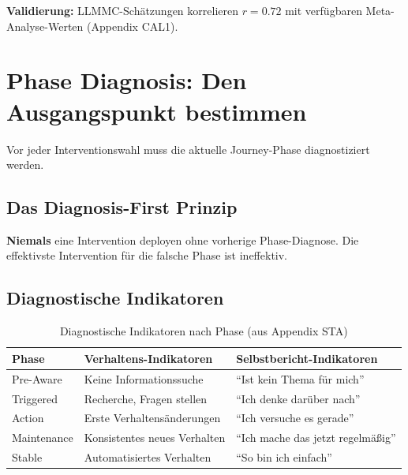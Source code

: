 \textbf{Validierung:} LLMMC-Schätzungen korrelieren $r = 0.72$ mit verfügbaren Meta-Analyse-Werten (Appendix CAL1).


\section{Phase Diagnosis: Den Ausgangspunkt bestimmen}
\label{sec:18-diagnosis}

Vor jeder Interventionswahl muss die aktuelle Journey-Phase diagnostiziert werden.

\subsection{Das Diagnosis-First Prinzip}

\begin{tcolorbox}[colback=blue!5!white, colframe=blue!75!black,
    title=Prinzip: Diagnosis Before Intervention]
\textbf{Niemals} eine Intervention deployen ohne vorherige Phase-Diagnose. Die effektivste Intervention für die falsche Phase ist ineffektiv.
\end{tcolorbox}

\subsection{Diagnostische Indikatoren}

\begin{table}[htbp]
\centering
\caption{Diagnostische Indikatoren nach Phase (aus Appendix STA)}
\label{tab:18-diagnosis-indicators}
\renewcommand{\arraystretch}{1.4}
\small
\begin{tabular}{@{}lll@{}}
\toprule
\textbf{Phase} & \textbf{Verhaltens-Indikatoren} & \textbf{Selbstbericht-Indikatoren} \\
\midrule
Pre-Aware & Keine Informationssuche & ``Ist kein Thema für mich'' \\
Triggered & Recherche, Fragen stellen & ``Ich denke darüber nach'' \\
Action & Erste Verhaltensänderungen & ``Ich versuche es gerade'' \\
Maintenance & Konsistentes neues Verhalten & ``Ich mache das jetzt regelmäßig'' \\
Stable & Automatisiertes Verhalten & ``So bin ich einfach'' \\
\bottomrule
\end{tabular}
\end{table}


